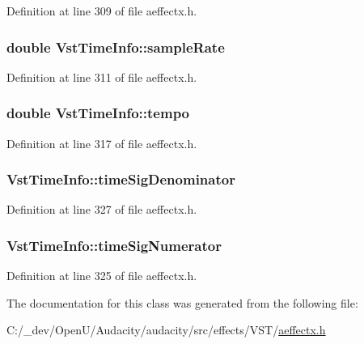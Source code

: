 Definition at line 309 of file aeffectx.\+h.

\subsubsection[{\texorpdfstring{sample\+Rate}{sampleRate}}]{\setlength{\rightskip}{0pt plus 5cm}double Vst\+Time\+Info\+::sample\+Rate}\hypertarget{class_vst_time_info_a4eeabf8718165724415405006df7f445}{}\label{class_vst_time_info_a4eeabf8718165724415405006df7f445}


Definition at line 311 of file aeffectx.\+h.

\subsubsection[{\texorpdfstring{tempo}{tempo}}]{\setlength{\rightskip}{0pt plus 5cm}double Vst\+Time\+Info\+::tempo}\hypertarget{class_vst_time_info_a239c72a382d14e54df88db80f164f368}{}\label{class_vst_time_info_a239c72a382d14e54df88db80f164f368}


Definition at line 317 of file aeffectx.\+h.

\subsubsection[{\texorpdfstring{time\+Sig\+Denominator}{timeSigDenominator}}]{ Vst\+Time\+Info\+::time\+Sig\+Denominator}\hypertarget{class_vst_time_info_a981a0fd6aaa107fa3d6ffb62ced70f35}{}\label{class_vst_time_info_a981a0fd6aaa107fa3d6ffb62ced70f35}


Definition at line 327 of file aeffectx.\+h.

\subsubsection[{\texorpdfstring{time\+Sig\+Numerator}{timeSigNumerator}}]{ Vst\+Time\+Info\+::time\+Sig\+Numerator}\hypertarget{class_vst_time_info_aea61c510ba02eb75996b61f088f727b1}{}\label{class_vst_time_info_aea61c510ba02eb75996b61f088f727b1}


Definition at line 325 of file aeffectx.\+h.



The documentation for this class was generated from the following file\+:\begin{DoxyCompactItemize}
\item 
C\+:/\+\_\+dev/\+Open\+U/\+Audacity/audacity/src/effects/\+V\+S\+T/\hyperlink{aeffectx_8h}{aeffectx.\+h}\end{DoxyCompactItemize}
